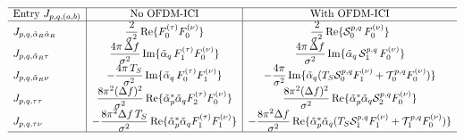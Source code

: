 \documentclass[11pt]{article}
\begin{document}
\begin{table}[h]
\centering
\small
\renewcommand{\arraystretch}{1.8}
\[
\begin{array}{l|c|c}
\hline
\text{Entry } J_{p,q,(a,b)}
    & \text{No OFDM-ICI}
    & \text{With OFDM-ICI} \\
\hline
J_{p,q,\tilde{\alpha}_R\tilde{\alpha}_R}
    & \dfrac{2}{\sigma^2}\,\mathrm{Re}\{F_0^{(\tau)} F_0^{(\nu)}\}
    & \dfrac{2}{\sigma^2}\,\mathrm{Re}\{\mathcal{S}_0^{p,q}\, F_0^{(\nu)}\} \\
J_{p,q,\tilde{\alpha}_R\tau}
    & \dfrac{4\pi\,\Delta f}{\sigma^2}\,\mathrm{Im}\{\tilde{\alpha}_q\, F_1^{(\tau)} F_0^{(\nu)}\}
    & \dfrac{4\pi\,\Delta f}{\sigma^2}\,\mathrm{Im}\{\tilde{\alpha}_q\,\mathcal{S}_1^{p,q}\, F_0^{(\nu)}\} \\
J_{p,q,\tilde{\alpha}_R\nu}
    & -\dfrac{4\pi\, T_S}{\sigma^2}\,\mathrm{Im}\{\tilde{\alpha}_q\, F_0^{(\tau)} F_1^{(\nu)}\}
    & -\dfrac{4\pi}{\sigma^2}\,\mathrm{Im}\{\tilde{\alpha}_q(T_S\mathcal{S}_0^{p,q} F_1^{(\nu)} + \mathcal{T}_0^{p,q} F_0^{(\nu)})\} \\
J_{p,q,\tau\tau}
    & \dfrac{8\pi^2 (\Delta f)^2}{\sigma^2}\,\mathrm{Re}\{\tilde{\alpha}_p^*\tilde{\alpha}_q F_2^{(\tau)} F_0^{(\nu)}\}
    & \dfrac{8\pi^2 (\Delta f)^2}{\sigma^2}\,\mathrm{Re}\{\tilde{\alpha}_p^*\tilde{\alpha}_q \mathcal{S}_2^{p,q} F_0^{(\nu)}\} \\
J_{p,q,\tau\nu}
    & -\dfrac{8\pi^2 \Delta f\, T_S}{\sigma^2}\,\mathrm{Re}\{\tilde{\alpha}_p^*\tilde{\alpha}_q F_1^{(\tau)} F_1^{(\nu)}\}
    & -\dfrac{8\pi^2 \Delta f}{\sigma^2}\,\mathrm{Re}\{\tilde{\alpha}_p^*\tilde{\alpha}_q (T_S\mathcal{S}_1^{p,q} F_1^{(\nu)} + \mathcal{T}_1^{p,q} F_0^{(\nu)})\} \\
\hline
\end{array}
\]
\caption{Five representative entries of the expected off-diagonal
block \(\bm{J}_{p,q}\) (\(p\neq q\)) under i.i.d.\ unit-energy QPSK
signalling. The OFDM and OTFS columns coincide for each ICI model
(four-case comparison collapses to two), so only the two distinct
forms are listed. Notation:
\(F_a^{(\tau)} := F_a(-\Delta f\,\Delta\tau_{pq},N)\) and
\(F_b^{(\nu)} := F_b(T_S\,\Delta\nu_{pq},M)\). The
\(\nu\nu\)-entry is displayed separately in
equation~\eqref{eq:Jpq_nunu} due to its length; the remaining 10
off-diagonal entries follow from the same template by swapping
\(\mathrm{Re}\leftrightarrow\mathrm{Im}\), conjugating
\(\tilde{\alpha}\) factors, and replacing
\(\mathcal{T}\leftrightarrow\check{\mathcal{T}}\) where the role of
\(p\) and \(q\) is reversed.}
\label{tab:fim_cross}
\end{table}
\end{document}
